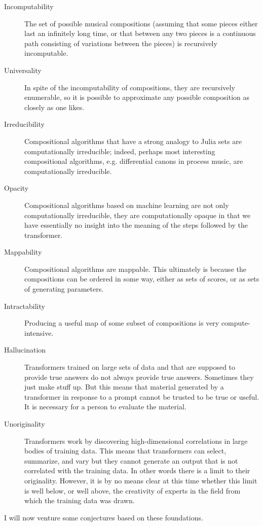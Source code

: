 \documentclass[11pt]{amsart}
\begin{document}
\begin{description}
\item[Incomputability] The set of possible musical compositions (assuming that some pieces either last an infinitely long time, or that between any two pieces is a continuous path consisting of variations between the pieces) is recursively incomputable.
\item[Universality] In spite of the incomputability of compositions, they are recursively enumerable, so it is possible to approximate any possible composition as closely as one likes.
\item[Irreducibility] Compositional algorithms that have a strong analogy to Julia sets are computationally irreducible; indeed, perhaps most interesting compositional algorithms, e.g. differential canons in process music, are computationally irreducible.
\item[Opacity] Compositional algorithms based on machine learning are not only computationally irreducible, they are computationally opaque in that we have essentially no insight into the meaning of the steps followed by the transformer.
\item[Mappability] Compositional algorithms are mappable. This ultimately is because the compositions can be ordered in some way, either as sets of scores, or as sets of generating parameters.
\item[Intractability] Producing a useful map of some subset of compositions is very compute-intensive. 
\item[Hallucination] Transformers trained on large sets of data and that are supposed to provide true answers do not always provide true answers. Sometimes they just make stuff up. But this means that material generated by a transformer in response to a prompt cannot be trusted to be true or useful. It is necessary for a person to evaluate the material.
\item[Unoriginality] Transformers work by discovering high-dimensional correlations in large bodies of training data. This means that transformers can select, summarize, and vary but they cannot generate an output that is not correlated with the training data. In other words there is a limit to their originality. However, it is by no means clear at this time whether this limit is well below, or well above, the creativity of experts in the field from which the training data was drawn.
\end{description}

I will now venture some conjectures based on these foundations.
\end{document}
